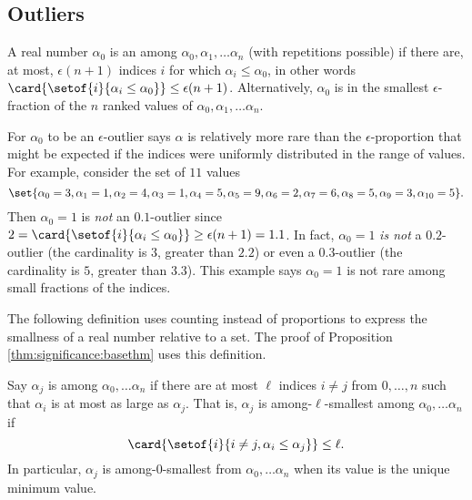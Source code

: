 \documentclass[12pt]{article}
\begin{document}
\subsection*{Outliers}

\begin{definition}
    A real number \( \alpha_0 \) is an %
    among \( \alpha_0, \alpha_1, \dots \alpha_n \) (with repetitions
    possible) if there are, at most, \( \epsilon(n + 1) \) indices \( i \)
    for which \( \alpha_i \le \alpha_0 \), in other words \( \card{%
    \setof{i}{\alpha_i \le \alpha_0}} \le \epsilon(n+1) \).
    Alternatively, \( \alpha_0 \) is in the smallest \( \epsilon \)-fraction
    of the \( n \) ranked values of \( \alpha_0, \alpha_1, \dots \alpha_n
    \).
\end{definition}

\begin{remark}
    For \( \alpha_0 \) to be an \( \epsilon \)-outlier says \( \alpha \)
    is relatively more rare than the \( \epsilon \)-proportion that
    might be expected if the indices were uniformly distributed in the
    range of values.  For example, consider the set of \( 11 \) values
    \[
    \set{\alpha_0 = 3, \alpha_1 = 1, \alpha_2 = 4, \alpha_3 = 1, \alpha_4
    = 5, \alpha_5 = 9, \alpha_6 = 2, \alpha_7 = 6, \alpha_8 = 5, \alpha_9
    = 3, \alpha_{10} = 5}.
    \]  Then \( \alpha_0 = 1 \) is \emph{not} an \(
    0.1 \)-outlier since \( 2 = \card{%
    \setof{i}{\alpha_i \le \alpha_0}} \ge \epsilon(n+1) = 1.1 \).  In
    fact, \( \alpha_0 = 1 \) \emph{is not} a \( 0.2 \)-outlier (the
    cardinality is \( 3 \), greater than \( 2.2 \)) or even a \( 0.3 \)-outlier
    (the cardinality is \( 5 \), greater than \( 3.3 \)).  This example
    says \( \alpha_0 = 1 \) is not rare among small fractions of the
    indices.

\end{remark}

The following definition uses counting instead of proportions to express
the smallness of a real number relative to a set.  The proof of
Proposition~%
\ref{thm:significance:basethm} uses this definition.

\begin{definition}
    Say \( \alpha_j \) is %
    among \( \alpha_0, \dots \alpha_n \) if there are at most \( \ell \)
    indices \( i \ne j \) from \( 0, \dots, n \) such that \( \alpha_i \)
    is at most as large as \( \alpha_j \).  That is, \( \alpha_j \) is
    among-\( \ell \)-smallest among \( \alpha_0, \dots \alpha_n \) if
    \[
        \card{ \setof{i}{i \ne j, \alpha_i \le \alpha_j}} \le \ell.
    \] In particular, \( \alpha_j \) is among-\( 0 \)-smallest from \(
    \alpha_0, \dots \alpha_n \) when its value is the unique minimum
    value.
\end{definition}
\end{document}
